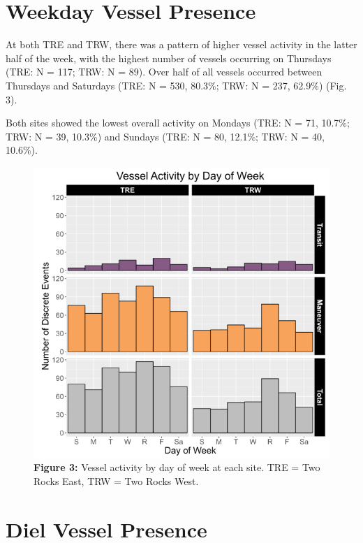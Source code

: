 \documentclass[
  letterpaper,
  oneside,
  open=any]{scrbook}
\begin{document}
\section{Weekday Vessel Presence}\label{weekday-vessel-presence}

At both TRE and TRW, there was a pattern of higher vessel activity in
the latter half of the week, with the highest number of vessels
occurring on Thursdays (TRE: N = 117; TRW: N = 89). Over half of all
vessels occurred between Thursdays and Saturdays (TRE: N = 530, 80.3\%;
TRW: N = 237, 62.9\%) (Fig. 3).

Both sites showed the lowest overall activity on Mondays (TRE: N = 71,
10.7\%; TRW: N = 39, 10.3\%) and Sundays (TRE: N = 80, 12.1\%; TRW: N =
40, 10.6\%).

\begin{figure}[H]

{\centering \includegraphics{images/Figure.3.PNG}

}

\caption{\textbf{Figure 3:} Vessel activity by day of week at each site.
TRE = Two Rocks East, TRW = Two Rocks West.}

\end{figure}%

\section{Diel Vessel Presence}\label{diel-vessel-presence}
\end{document}
